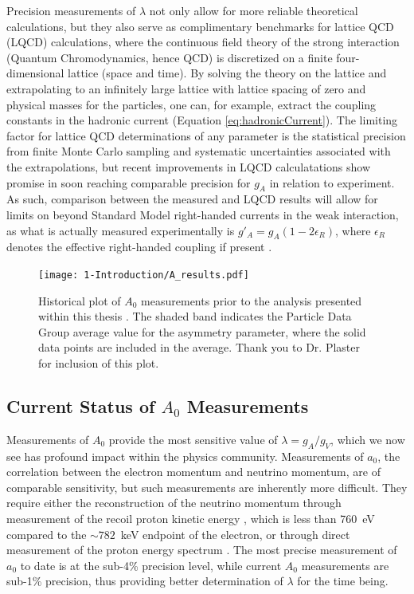 Precision measurements of $\lambda$ not only allow for more reliable theoretical calculations, but
they also serve as complimentary benchmarks for lattice QCD (LQCD) calculations, where the continuous
field theory of the strong interaction (Quantum Chromodynamics, hence QCD)
is discretized on a finite four-dimensional lattice (space and time). By solving the theory on
the lattice and extrapolating to an infinitely large lattice with lattice spacing of zero 
and physical masses for the particles, one can, for example, extract the coupling constants in the
hadronic current (Equation \ref{eq:hadronicCurrent}). The limiting factor for lattice QCD
determinations of any parameter is the statistical precision from finite Monte Carlo sampling
and systematic uncertainties associated with the extrapolations, but recent improvements in
LQCD calculatations \cite{bhattacharya2016,capitani2017iso,berkowitz2017accurate,chang2017nucleon}
show promise in soon reaching comparable precision for $g_A$ in relation to
experiment. As such, comparison between the measured and LQCD results will allow for limits on
beyond Standard Model right-handed currents in the weak interaction, as what is actually measured experimentally
is $g'_A = g_A(1-2\epsilon_R)$, where $\epsilon_R$ denotes the effective right-handed coupling if present
\cite{cirigliano2013beta,gonzalez2016global,alioli2017right}.

\begin{figure} [h]
  \centering
  \texttt{[image: 1-Introduction/A\_results.pdf]}
  \caption{Historical plot of $A_0$ measurements prior to the analysis presented within
    this thesis
    \cite{bopp1986,erozolimskii1991new,yerozolimsky1997,liaud1997,abele2002,mund2013,mendenhall2013}.
    The shaded band indicates the Particle Data Group average value \cite{pdg}
    for the asymmetry parameter, where the solid data points are included in the average. Thank you
    to Dr. Plaster for inclusion of this plot.}
  \label{fig:Ameasurements}
\end{figure}


\subsection{Current Status of $A_0$ Measurements} \label{ssec:Previous_results}

Measurements of $A_0$ provide the most sensitive value of $\lambda = g_A/g_V$,
which we now see has profound impact within the physics community.
Measurements of $a_0$, the correlation between the electron momentum and
neutrino momentum, are of comparable sensitivity, but such measurements are inherently more difficult.
They require either the reconstruction of the neutrino momentum through measurement of the recoil proton
kinetic energy \cite{darius2017measurement}, which is less than 760~eV compared to the $\sim782$~keV endpoint
of the electron, or through direct measurement of
the proton energy spectrum \cite{byrne2002determination}. The most precise measurement of $a_0$ to date
is at the sub-4\% precision level, while current $A_0$ measurements are sub-1\% precision, thus providing
better determination of $\lambda$ for the time being.

